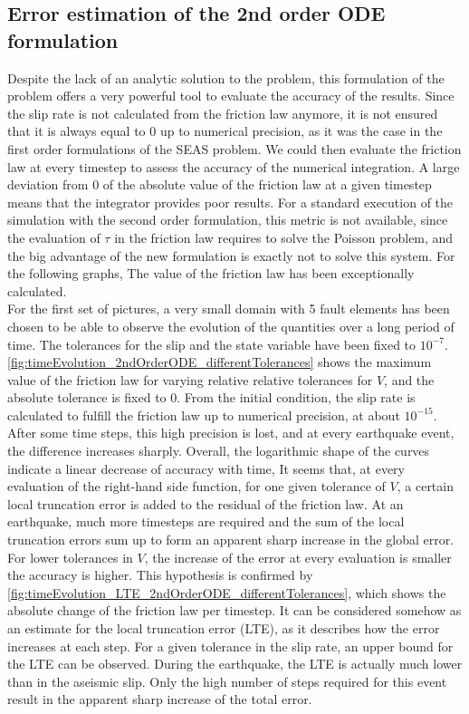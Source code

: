 \subsection{Error estimation of the 2nd order ODE formulation}
Despite the lack of an analytic solution to the problem, this formulation of the problem offers a very powerful tool to evaluate the accuracy of the results. Since the slip rate is not calculated from the friction law anymore, it is not ensured that it is always equal to 0 up to numerical precision, as it was the case in the first order formulations of the SEAS problem. We could then evaluate the friction law at every timestep to assess the accuracy of the numerical integration. A large deviation from 0 of the absolute value of the friction law at a given timestep means that the integrator provides poor results. For a standard execution of the simulation with the second order formulation, this metric is not available, since the evaluation of $\tau$ in the friction law requires to solve the Poisson problem, and the big advantage of the new formulation is exactly not to solve this system. For the following graphs, The value of the friction law has been exceptionally calculated. \\

For the first set of pictures, a very small domain with 5 fault elements has been chosen to be able to observe the evolution of the quantities over a long period of time. The tolerances for the slip and the state variable have been fixed to $10^{-7}$. \autoref{fig:timeEvolution_2ndOrderODE_differentTolerances} shows the maximum value of the friction law for varying relative relative tolerances for $V$, and the absolute tolerance is fixed to 0. From the initial condition, the slip rate is calculated to fulfill the friction law up to numerical precision, at about $10^{-15}$. After some time steps, this high precision is lost, and at every earthquake event, the difference increases sharply. Overall, the logarithmic shape of the curves indicate a linear decrease of accuracy with time, It seems that, at every evaluation of the right-hand side function, for one given tolerance of $V$, a certain local truncation error is added to the residual of the friction law. At an earthquake, much more timesteps are required and the sum of the local truncation errors sum up to form an apparent sharp increase in the global error. For lower tolerances in $V$, the increase of the error at every evaluation is smaller the accuracy is higher. This hypothesis is confirmed by \autoref{fig:timeEvolution_LTE_2ndOrderODE_differentTolerances}, which shows the absolute change of the friction law per timestep. It can be considered somehow as an estimate for the local truncation error (LTE), as it describes how the error increases at each step. For a given tolerance in the slip rate, an upper bound for the LTE can be observed. During the earthquake, the LTE is actually much lower than in the aseismic slip. Only the high number of steps required for this event result in the apparent sharp increase of the total error. 

